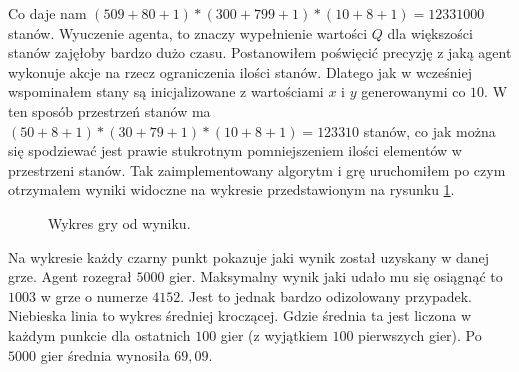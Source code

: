 \documentclass[a4paper, 12pt,twoside]{report}
\begin{document}
Co daje nam $(509 + 80 + 1) * (300 + 799 + 1) * (10 + 8 +1) = 12 331 000$
stanów. Wyuczenie agenta, to znaczy wypełnienie wartości $Q$ dla większości
stanów zajęłoby bardzo dużo czasu. Postanowiłem poświęcić precyzję z jaką agent
wykonuje akcje na rzecz ograniczenia ilości stanów. Dlatego jak w wcześniej
wspominałem stany są inicjalizowane z wartościami $x$ i $y$ generowanymi co
$10$. W ten sposób przestrzeń stanów ma $(50 + 8 + 1) * (30 + 79 + 1) * (10 + 8
+ 1) = 123 310$ stanów, co jak można się spodziewać jest prawie stukrotnym
pomniejszeniem ilości elementów w przestrzeni stanów. Tak zaimplementowany 
algorytm i grę uruchomiłem po czym otrzymałem wyniki
widoczne na wykresie przedstawionym na rysunku \ref{plot_first_approach}.
\begin{figure}[!htb]
	\begin{center}
		
	\end{center}
	\caption{Wykres gry od wyniku.}
	\label{plot_first_approach}
\end{figure}

Na wykresie każdy czarny punkt pokazuje jaki wynik został uzyskany w danej
grze. Agent
rozegrał $5000$ gier. Maksymalny wynik jaki udało mu się osiągnąć to $1003$ w
grze o numerze $4152$. Jest to jednak bardzo odizolowany przypadek. Niebieska
linia to wykres średniej kroczącej. Gdzie średnia ta jest liczona w każdym
punkcie dla ostatnich $100$ gier (z wyjątkiem $100$ pierwszych gier). Po $5000$
gier średnia wynosiła $69,09$.
\end{document}
